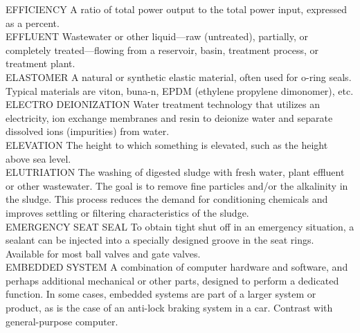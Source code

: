 EFFICIENCY
A ratio of total power output to the total power input, expressed as a percent.
\vspace{0.3cm}\\
EFFLUENT
Wastewater or other liquid—raw (untreated), partially, or completely treated—flowing from a reservoir, basin, treatment process, or treatment plant. 
\vspace{0.3cm}\\
ELASTOMER
A natural or synthetic elastic material, often used for o-ring seals. Typical materials are viton, buna-n, EPDM (ethylene propylene dimonomer), etc.
\vspace{0.3cm}\\
ELECTRO DEIONIZATION
Water treatment technology that utilizes an electricity, ion exchange membranes and resin to deionize water and separate dissolved ions (impurities) from water.
\vspace{0.3cm}\\
ELEVATION
The height to which something is elevated, such as the height above sea level. 
\vspace{0.3cm}\\
ELUTRIATION
The washing of digested sludge with fresh water, plant effluent or other wastewater. The goal is to remove fine particles and/or the alkalinity in the sludge. This process reduces the demand for conditioning chemicals and improves settling or filtering characteristics of the sludge.
\vspace{0.3cm}\\
EMERGENCY SEAT SEAL
To obtain tight shut off in an emergency situation, a sealant can be injected into a specially designed groove in the seat rings. Available for most ball valves and gate valves.
\vspace{0.3cm}\\
EMBEDDED SYSTEM
A combination of computer hardware and software, and perhaps additional mechanical or other parts, designed to perform a dedicated function. In some cases, embedded systems are part of a larger system or product, as is the case of an anti-lock braking system in a car. Contrast with general-purpose computer.
\vspace{0.3cm}\\

